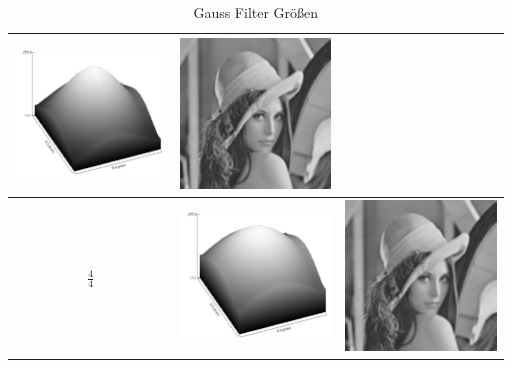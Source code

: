 \documentclass[12pt,german]{article}
\begin{document}
\begin{table}[H]
\begin{tabular}{| c | c | c |}
	\includegraphics[width=4cm]{../testData/Gauss/GaussBellR4S3.jpg} & 	\includegraphics[width=4cm]{../testData/Gauss/LenaR4S3.jpg} \\
	    \hline
    $ \frac{4}{4} $ &
	\includegraphics[width=4cm]{../testData/Gauss/GaussBellR4S4.jpg} & 	\includegraphics[width=4cm]{../testData/Gauss/LenaR4S4.jpg} \\
  \end{tabular}
  \caption{Gauss Filter Größen}
  \label{tab:GaussFilterGroessen}
\end{table}
\end{document}
